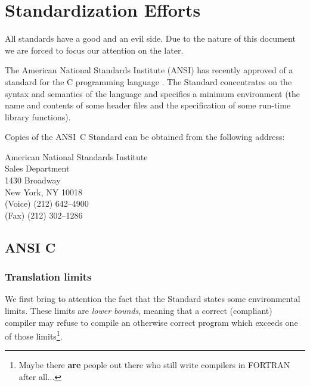 \section{Standardization Efforts}

All standards have a good and an evil side. Due to the nature of this
 document we are forced to focus our attention on the later.

The American National Standards Institute (ANSI) has recently approved
of a standard for the C programming language \cite{kn:ansi}. The Standard
concentrates on the syntax and semantics of the language and specifies
a minimum environment (the name and contents of some header files and
the specification of some run-time library functions).

Copies of the ANSI~C Standard can be obtained from the following address:
{\small
\begin{center}
\begin{flushleft}
American National Standards Institute\\
Sales Department\\
1430 Broadway\\
New York, NY 10018\\
(Voice) (212) 642--4900\\
(Fax) (212) 302--1286\\
\end{flushleft}
\end{center}
}

\subsection{ANSI C}

\subsubsection{Translation limits}

We first bring to attention the fact that the Standard states some
environmental limits. These limits are {\em lower bounds}, meaning that
a correct (compliant) compiler may refuse to compile an otherwise correct
 program which exceeds one of those limits\footnote{Maybe
 there {\bf are} people out there
who still write compilers in FORTRAN after all...}.


